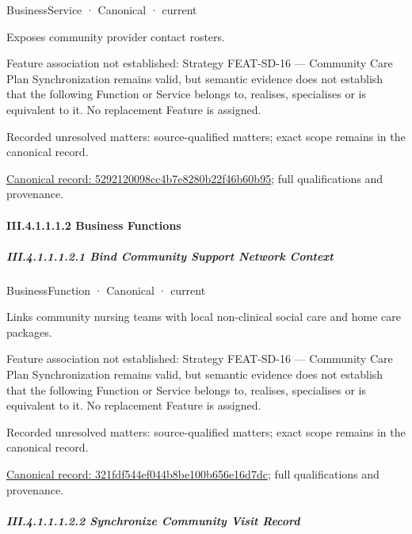 \label{element:5292120098cc4b7e8280b22f46b60b95}
{\small BusinessService · Canonical · current}\par

Exposes community provider contact rosters.



Feature association not established: Strategy FEAT-SD-16 — Community Care Plan Synchronization remains valid, but semantic evidence does not establish that the following Function or Service belongs to, realises, specialises or is equivalent to it. No replacement Feature is assigned.


{\small Recorded unresolved matters: source-qualified matters; exact scope remains in the canonical record.}\par
{\footnotesize \href{../../../../continuum/business/business-service/5292120098cc4b7e8280b22f46b60b95.md}{Canonical record: 5292120098cc4b7e8280b22f46b60b95}; full qualifications and provenance.}\par
\paragraph*{III.4.1.1.1.2 Business Functions}
\label{navigation:III.4.1.1.1.2}

\subparagraph*{III.4.1.1.1.2.1 Bind Community Support Network Context}
\label{navigation:III.4.1.1.1.2.1}

\label{element:321fdf544ef044b8be100b656e16d7dc}
{\small BusinessFunction · Canonical · current}\par

Links community nursing teams with local non-clinical social care and home care packages.



Feature association not established: Strategy FEAT-SD-16 — Community Care Plan Synchronization remains valid, but semantic evidence does not establish that the following Function or Service belongs to, realises, specialises or is equivalent to it. No replacement Feature is assigned.


{\small Recorded unresolved matters: source-qualified matters; exact scope remains in the canonical record.}\par
{\footnotesize \href{../../../../continuum/business/business-function/321fdf544ef044b8be100b656e16d7dc.md}{Canonical record: 321fdf544ef044b8be100b656e16d7dc}; full qualifications and provenance.}\par
\subparagraph*{III.4.1.1.1.2.2 Synchronize Community Visit Record}
\label{navigation:III.4.1.1.1.2.2}

